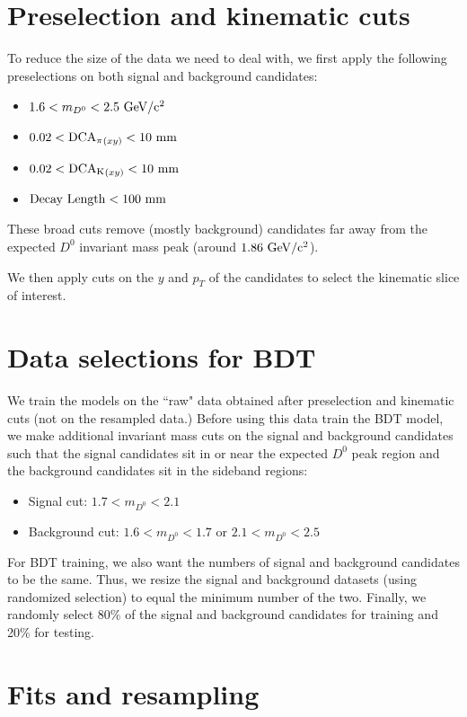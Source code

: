 \section{Preselection and kinematic cuts}
\label{app.presel}
To reduce the size of the data we need to deal with, we first apply the following preselections on both signal and background candidates:
\begin{itemize}
    \item $1.6 < m_{D^0} < 2.5 ~{\rm GeV/c^2}$
    \item $0.02 < {\rm DCA_\pi}_{(xy)} < 10 ~{\rm mm}$
    \item $0.02 < {\rm DCA_K}_{(xy)} < 10 ~{\rm mm}$
    \item ${\rm Decay~Length} < 100 ~ {\rm mm}$
\end{itemize}
These broad cuts remove (mostly background) candidates far away from the expected $D^0$ invariant mass peak (around $1.86~{\rm GeV/c^2}$).

We then apply cuts on the $y$ and $p_T$ of the candidates to select the kinematic slice of interest.

\section{Data selections for BDT}
\label{app.presel}
We train the models on the ``raw" data obtained after preselection and kinematic cuts (not on the resampled data.) Before using this data train the BDT model, we make additional invariant mass cuts on the signal and background candidates such that the signal candidates sit in or near the expected $D^0$ peak region and the background candidates sit in the sideband regions:
\begin{itemize}
    \item Signal cut: $1.7 < m_{D^0}<2.1$
    \item Background cut: $1.6 < m_{D^0}<1.7$ or $2.1 < m_{D^0}<2.5$
\end{itemize}

For BDT training, we also want the numbers of signal and background candidates to be the same. Thus, we resize the signal and background datasets (using randomized selection) to equal the minimum number of the two. Finally, we randomly select 80\% of the signal and background candidates for training and 20\% for testing.

\section{Fits and resampling}
\label{app.resamp}

